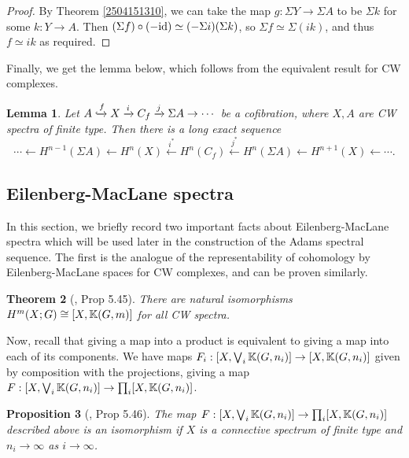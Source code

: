 \documentclass[11pt, titlepage]{article} %
\def\bb{\ensuremath\mathbb}
\def\xinj{\ensuremath\xhookrightarrow}
\def\id{\ensuremath\text{id}}
\numberwithin{equation}{subsection}
\theoremstyle{plain}
\newtheorem{theorem}{Theorem}[subsection]
\newtheorem{lemma}[theorem]{Lemma}
\newtheorem{proposition}[theorem]{Proposition}
\theoremstyle{definition}
\begin{document}
\begin{proof}
By Theorem \ref{2504151310}, we can take the map \(g : \Sigma Y \to \Sigma A\) to be \(\Sigma k\) for some \(k : Y \to A\). Then \((\Sigma f)\circ (-\id) \simeq (-\Sigma i)(\Sigma k)\), so \(\Sigma f\simeq \Sigma(ik)\), and thus \(f \simeq ik\) as required.
\end{proof}

Finally, we get the lemma below, which follows from the equivalent result for CW complexes. 

\begin{lemma}\label{2504140954}
Let \(A \xinj f X \xrightarrow{i} C_f \xrightarrow{j} \Sigma A \to \cdots\) be a cofibration, where \(X, A\) are CW spectra of finite type. Then there is a long exact sequence 
\[\cdots \leftarrow H^{n-1}(\Sigma A) \leftarrow H^n(X) \xleftarrow{i^*} H^n(C_f) \xleftarrow{j^*} H^n(\Sigma A)\leftarrow H^{n+1}(X) \leftarrow \cdots.\]
\end{lemma}

\subsection{Eilenberg-MacLane spectra}\label{2504291245}

In this section, we briefly record two important facts about Eilenberg-MacLane spectra which will be used later in the construction of the Adams spectral sequence. The first is the analogue of the representability of cohomology by Eilenberg-MacLane spaces for CW complexes, and can be proven similarly.

\begin{theorem}[{\autocite{hatcher5}, Prop 5.45}]\label{2503221328}
There are natural isomorphisms \(H^m(X;G)\cong [X,\bb{K}(G,m)]\) for all CW spectra.
\end{theorem}

Now, recall that giving a map into a product is equivalent to giving a map into each of its components. We have maps \(F_i : [X, \bigvee_i \bb{K}(G,n_i)]\to [X,\bb{K}(G,n_i)]\) given by composition with the projections, giving a map \(F : [X, \bigvee_i \bb{K}(G,n_i)]\to \prod_i [X,\bb{K}(G,n_i)]\).

\begin{proposition}[{\autocite{hatcher5}, Prop 5.46}]\label{2503231218}
The map \(F : [X, \bigvee_i \bb{K}(G,n_i)]\to \prod_i [X,\bb{K}(G,n_i)]\) described above is an isomorphism if \(X\) is a connective spectrum of finite type and \(n_i\to \infty\) as \(i\to\infty\). 
\end{proposition}
\end{document}
